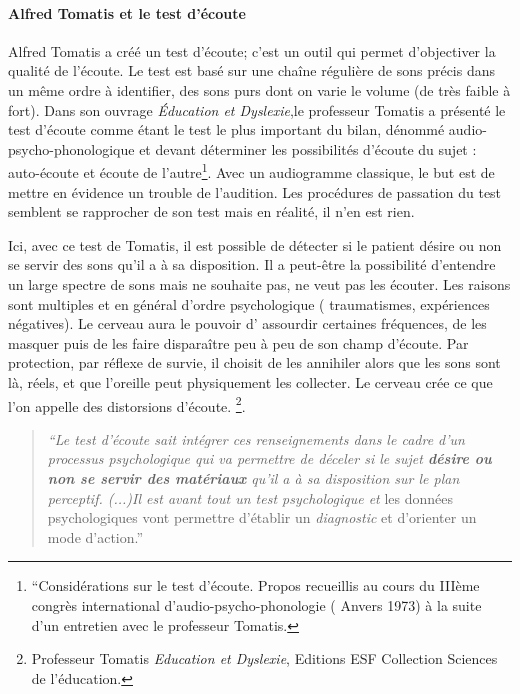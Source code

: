 \paragraph{Alfred Tomatis et le test d'écoute}
  Alfred Tomatis a créé un test d'écoute; c'est un outil qui permet d'objectiver la qualité de l'écoute.
  Le test est  basé sur une chaîne régulière de sons précis dans un même ordre à identifier, des sons purs dont on varie le volume (de très faible à fort). Dans son ouvrage \emph{Éducation et Dyslexie},le professeur Tomatis
  a présenté le test d'écoute comme étant le test le plus important du
  bilan, dénommé audio-psycho-phonologique et devant déterminer les
  possibilités d'écoute du sujet : auto-écoute et écoute de
  l'autre\footnote{``Considérations sur le test d'écoute. Propos
  	recueillis au cours du IIIème congrès international
  	d'audio-psycho-phonologie ( Anvers 1973) à la suite d'un entretien
  	avec le professeur Tomatis.}. 
  Avec un audiogramme classique, le but est de mettre en évidence un trouble de l'audition. Les procédures de passation du test semblent se rapprocher de son test mais en réalité, il n'en est rien. 
  
  Ici, avec ce test de Tomatis, il est possible de détecter si le patient désire ou non se servir des sons
  qu'il a à sa disposition. Il a peut-être la possibilité d'entendre un large spectre de
  sons mais ne souhaite pas, ne veut pas les écouter. Les raisons sont multiples et en général d'ordre psychologique ( traumatismes,
  expériences négatives). Le cerveau aura le
  pouvoir d' assourdir certaines fréquences, de les masquer puis de les faire disparaître peu à peu de
  son champ d'écoute. Par protection, par réflexe de survie, il choisit de les
  annihiler alors que les sons sont là, réels, et que  l'oreille peut physiquement les collecter. Le cerveau crée ce
  que l'on appelle des distorsions d'écoute. \footnote{Professeur
    Tomatis \emph{Education et Dyslexie},  Editions ESF
    Collection Sciences de l'éducation.}. %

\begin{quote}
\emph{``Le test d'écoute sait intégrer ces renseignements dans le
cadre d'un processus psychologique qui va permettre de déceler si
le sujet\textbf{ désire ou non se servir des matériaux }qu'il a à sa disposition
sur le plan perceptif. (...)Il est avant tout un test psychologique
et} les données psychologiques vont permettre d'établir un\emph{ diagnostic}
et d'orienter un mode d'action.''
\end{quote}

